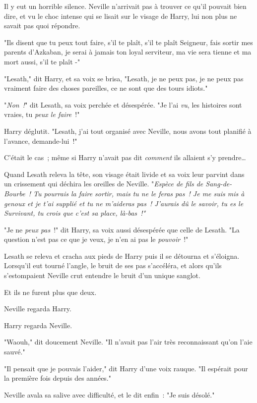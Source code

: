 Il y eut un horrible silence. Neville n'arrivait pas à trouver ce qu'il pouvait bien dire, et vu le choc intense qui se lisait sur le visage de Harry, lui non plus ne savait pas quoi répondre.

"Ils disent que tu peux tout faire, s'il te plaît, s'il te plaît Seigneur, fais sortir mes parents d'Azkaban, je serai à jamais ton loyal serviteur, ma vie sera tienne et ma mort aussi, s'il te plaît -"

"Lesath," dit Harry, et sa voix se brisa, "Lesath, je ne peux pas, je ne peux pas vraiment faire des choses pareilles, ce ne sont que des tours idiots."

"\emph{Non~!}" dit Lesath, sa voix perchée et désespérée. "Je l'ai \emph{vu}, les histoires sont vraies, tu \emph{peux le faire}~!"

Harry déglutit. "Lesath, j'ai tout organisé avec Neville, nous avons tout planifié à l'avance, demande-lui~!"

C'était le cas~; même si Harry n'avait pas dit \emph{comment} ils allaient s'y prendre…

Quand Lesath releva la tête, son visage était livide et sa voix leur parvint dans un crissement qui déchira les oreilles de Neville. "\emph{Espèce de fils de Sang-de-Bourbe~! Tu pourrais la faire sortir, mais tu ne le feras pas~! Je me suis mis à genoux et je t'ai supplié et tu ne m'aideras pas~! J'aurais dû le savoir, tu es le Survivant, tu crois que c'est sa place, là-bas~!"}

"Je ne \emph{peux pas}~!" dit Harry, sa voix aussi désespérée que celle de Lesath. "La question n'est pas ce que je veux, je n'en ai pas le \emph{pouvoir}~!"

Lesath se releva et cracha aux pieds de Harry puis il se détourna et s'éloigna. Lorsqu'il eut tourné l'angle, le bruit de ses pas s'accéléra, et alors qu'ils s'estompaient Neville crut entendre le bruit d'un unique sanglot.

Et ils ne furent plus que deux.

Neville regarda Harry.

Harry regarda Neville.

"Waouh," dit doucement Neville. "Il n'avait pas l'air très reconnaissant qu'on l'aie sauvé."

"Il pensait que je pouvais l'aider," dit Harry d'une voix rauque. "Il espérait pour la première fois depuis des années."

Neville avala sa salive avec difficulté, et le dit enfin~: "Je suis désolé."

